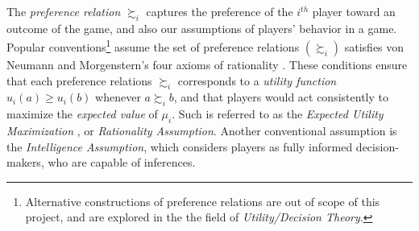 \documentclass[11pt,reqno, a4]{amsart}
\begin{document}
The \textit{preference relation} $\succsim_i$ captures the preference of the $i^{th}$ player toward an outcome of the game, and also our assumptions of players' behavior in a game. Popular conventions\footnote{Alternative constructions of preference relations are out of scope of this project, and are explored in the the field of \textit{Utility/Decision Theory}.} assume the set of preference relations $(\succsim_i)$ satisfies von Neumann and Morgenstern's four axioms of rationality \cite{myerson_game_2013}. These conditions ensure that each preference relations $\succsim_i$ corresponds to a \textit{utility function} $u_i(a) \geq u_i(b)$ whenever $a \succsim_i b$, and that players would act consistently to maximize the \textit{expected value} of $\mu_i$. Such is referred to as the 
\textit{Expected Utility Maximization} \cite{myerson_game_2013}, or \textit{Rationality Assumption}. Another conventional assumption is the \textit{Intelligence Assumption}, which considers players as fully informed decision-makers, who are capable of inferences.
\end{document}
